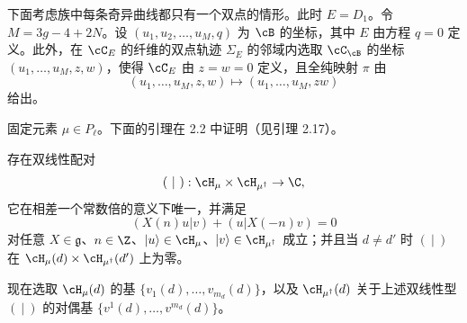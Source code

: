下面考虑族中每条奇异曲线都只有一个双点的情形。此时 $E=D_1$。令 $M=3g-4+2N$。设 $(u_1,u_2,\dots,u_M,q)$ 为 $\cB$ 的坐标，其中 $E$ 由方程 $q=0$ 定义。此外，在 $\cC_E$ 的纤维的双点轨迹 $\Sigma_E$ 的邻域内选取 $\cC_\cB$ 的坐标 $(u_1,\dots,u_M,z,w)$，使得 $\cC_E$ 由 $z=w=0$ 定义，且全纯映射 $\pi$ 由
\begin{equation}
 (u_1,\dots,u_M,z,w)\mapsto(u_1,\dots,u_M,zw) \tag{4.24}
\end{equation}
给出。


固定元素 $\mu\in P_\ell$。下面的引理在 2.2 中证明（见引理 2.17）。

\begin{lemma}[4.14]
存在双线性配对
\[
 (\ |\ ):\cH_\mu\times\cH_{\mu^\dagger}\to\C,
\]
它在相差一个常数倍的意义下唯一，并满足
\[
 (X(n)u|v)+(u|X(-n)v)=0
\]
对任意 $X\in\mathfrak g$、$n\in\Z$、$|u\rangle\in\cH_\mu$、$|v\rangle\in\cH_{\mu^\dagger}$ 成立；并且当 $d\ne d'$ 时 $(\ |\ )$ 在 $\cH_\mu(d)\times\cH_{\mu^\dagger}(d')$ 上为零。
\end{lemma}


现在选取 $\cH_\mu(d)$ 的基 $\{v_1(d),\dots,v_{m_d}(d)\}$，以及 $\cH_{\mu^\dagger}(d)$ 关于上述双线性型 $(\ |\ )$ 的对偶基 $\{v^1(d),\dots,v^{m_d}(d)\}$。


